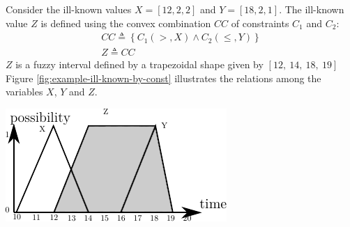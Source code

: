 \begin{example}
Consider the ill-known values $X = \left[12, 2, 2\right]$ and $Y = \left[18, 2, 1 \right]$. The ill-known value $Z$ is defined using the convex combination $CC$ of constraints $C_1$ and $C_2$:
\begin{align}
\nonumber
CC \triangleq \left \lbrace C_1\left(>,X\right) \wedge C_2(\leq,Y) \right \rbrace \\
\nonumber
Z \triangleq CC
\end{align}
$Z$ is a fuzzy interval defined by a trapezoidal shape given by $\left[12,\ 14,\ 18,\ 19 \right]$
Figure \ref{fig:example-ill-known-by-const} illustrates the relations among the variables $X$, $Y$ and $Z$.
\end{example}

\vspace*{13pt}
\begin{center}
{
\includegraphics[scale=1]{./graphs/ill-known-by-constraints.pdf}
\label{fig:example-ill-known-by-const}
}
\end{center}
\vspace*{10pt}
\vspace*{13pt}

%




